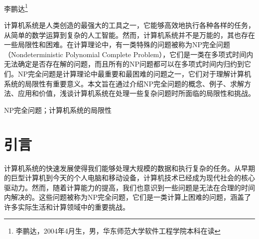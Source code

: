\documentclass[UTF8,openany,zihao=5]{ctexbook}
\begin{document}
\setcounter{page}{1}

\begin{center}
  ~\\[1em]
  {
  \heiti{}\\
  \\
  \vspace{0.8em}
  \kaishu{}李鹏达\footnote{李鹏达，2004年4月生，男，华东师范大学软件工程学院本科在读}\\
  \vspace{0.2em}
  \songti{}
  }
\end{center}

\pagestyle{plain}


\linespread{1.1}
{
  计算机系统是人类创造的最强大的工具之一，它能够高效地执行各种各样的任务，从简单的数学运算到复杂的人工智能。然而，计算机系统并不是万能的，其也存在一些局限性和困难。在计算理论中，有一类特殊的问题被称为NP完全问题（Nondeterministic Polynomial Complete Problem），它们是一类在多项式时间内无法确定是否存在解的问题，而且所有的NP问题都可以在多项式时间内归约到它们。NP完全问题是计算理论中最重要和最困难的问题之一，它们对于理解计算机系统的局限性有重要意义。本文旨在通过介绍NP完全问题的概念、例子、求解方法、应用和价值，浅谈计算机系统在处理一些复杂问题时所面临的局限性和挑战。

  NP完全问题；计算机系统的局限性
}
\linespread{1.25}

\songti{}
\chapter{引言}

计算机系统的快速发展使得我们能够处理大规模的数据和执行复杂的任务。从早期的巨型计算机到今天的个人电脑和移动设备，计算机技术已经成为现代社会的核心驱动力。然而，随着计算能力的提高，我们也意识到一些问题是无法在合理的时间内解决的。这些问题被称为NP完全问题，它们是一类计算上困难的问题，涵盖了许多实际生活和计算领域中的重要挑战。
\end{document}
